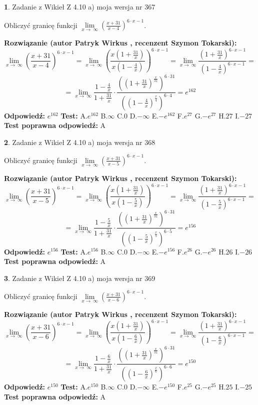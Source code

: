 \documentclass[12pt, a4paper]{article}
\theoremstyle{definition} %
\newtheorem{zad}{}
\newcommand{\zadStart}[1]{\begin{zad}#1\newline}
\newcommand{\zadStop}{\end{zad}}
\newcommand{\rozwStart}[2]{\noindent \textbf{Rozwiązanie (autor #1 , recenzent #2): }\newline}
\newcommand{\rozwStop}{\newline}
\newcommand{\odpStart}{\noindent \textbf{Odpowiedź:}\newline}
\newcommand{\odpStop}{\newline}
\newcommand{\testStart}{\noindent \textbf{Test:}\newline}
\newcommand{\testStop}{\newline}
\newcommand{\kluczStart}{\noindent \textbf{Test poprawna odpowiedź:}\newline}
\newcommand{\kluczStop}{\newline}
\begin{document}
\zadStart{Zadanie z Wikieł Z 4.10 a) moja wersja nr 367}

Obliczyć granicę funkcji  $\lim\limits_{x\to\ \infty}(\frac{x+31}{x-4})^{6\cdot x-1}$.
\zadStop
\rozwStart{Patryk Wirkus}{Szymon Tokarski}
$$\lim\limits_{x\to\ \infty}(\frac{x+31}{x-4})^{6\cdot x-1} = \lim\limits_{x\to\ \infty}(\frac{x(1+\frac{31}{x})}{x(1-\frac{4}{x})})^{6\cdot x-1}=\lim\limits_{x\to\ \infty}\frac{(1+\frac{31}{x})^{6\cdot x-1}}{(1-\frac{4}{x})^{6\cdot x-1}}=$$
$$=\lim\limits_{x\to\ \infty}\frac{1-\frac{4}{x}}{1+\frac{31}{x}}\cdot\frac{((1+\frac{31}{x})^{\frac{x}{31}})^{6\cdot31}}{((1-\frac{4}{x})^{\frac{x}{4}})^{6\cdot4}}=e^{162}$$
\rozwStop
\odpStart
$e^{162}$
\odpStop
\testStart
A.$e^{162}$ B.$\infty$ C.$0$ D.$-\infty$ E.$-e^{162}$
F.$e^{27}$ G.$-e^{27}$
H.$27$
I.$-27$
\testStop
\kluczStart
A
\kluczStop



\zadStart{Zadanie z Wikieł Z 4.10 a) moja wersja nr 368}

Obliczyć granicę funkcji  $\lim\limits_{x\to\ \infty}(\frac{x+31}{x-5})^{6\cdot x-1}$.
\zadStop
\rozwStart{Patryk Wirkus}{Szymon Tokarski}
$$\lim\limits_{x\to\ \infty}(\frac{x+31}{x-5})^{6\cdot x-1} = \lim\limits_{x\to\ \infty}(\frac{x(1+\frac{31}{x})}{x(1-\frac{5}{x})})^{6\cdot x-1}=\lim\limits_{x\to\ \infty}\frac{(1+\frac{31}{x})^{6\cdot x-1}}{(1-\frac{5}{x})^{6\cdot x-1}}=$$
$$=\lim\limits_{x\to\ \infty}\frac{1-\frac{5}{x}}{1+\frac{31}{x}}\cdot\frac{((1+\frac{31}{x})^{\frac{x}{31}})^{6\cdot31}}{((1-\frac{5}{x})^{\frac{x}{5}})^{6\cdot5}}=e^{156}$$
\rozwStop
\odpStart
$e^{156}$
\odpStop
\testStart
A.$e^{156}$ B.$\infty$ C.$0$ D.$-\infty$ E.$-e^{156}$
F.$e^{26}$ G.$-e^{26}$
H.$26$
I.$-26$
\testStop
\kluczStart
A
\kluczStop



\zadStart{Zadanie z Wikieł Z 4.10 a) moja wersja nr 369}

Obliczyć granicę funkcji  $\lim\limits_{x\to\ \infty}(\frac{x+31}{x-6})^{6\cdot x-1}$.
\zadStop
\rozwStart{Patryk Wirkus}{Szymon Tokarski}
$$\lim\limits_{x\to\ \infty}(\frac{x+31}{x-6})^{6\cdot x-1} = \lim\limits_{x\to\ \infty}(\frac{x(1+\frac{31}{x})}{x(1-\frac{6}{x})})^{6\cdot x-1}=\lim\limits_{x\to\ \infty}\frac{(1+\frac{31}{x})^{6\cdot x-1}}{(1-\frac{6}{x})^{6\cdot x-1}}=$$
$$=\lim\limits_{x\to\ \infty}\frac{1-\frac{6}{x}}{1+\frac{31}{x}}\cdot\frac{((1+\frac{31}{x})^{\frac{x}{31}})^{6\cdot31}}{((1-\frac{6}{x})^{\frac{x}{6}})^{6\cdot6}}=e^{150}$$
\rozwStop
\odpStart
$e^{150}$
\odpStop
\testStart
A.$e^{150}$ B.$\infty$ C.$0$ D.$-\infty$ E.$-e^{150}$
F.$e^{25}$ G.$-e^{25}$
H.$25$
I.$-25$
\testStop
\kluczStart
A
\kluczStop
\end{document}
